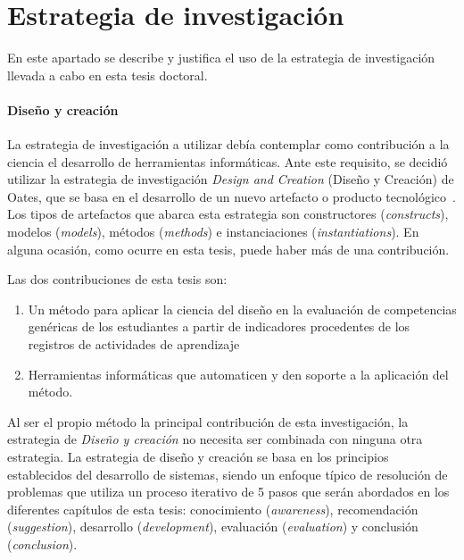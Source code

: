 

\section{Estrategia de investigación}
\label{sec:EstrategiaInvestigacion}

En este apartado se describe y justifica el uso de la estrategia de investigación llevada a cabo en esta tesis doctoral.  

\paragraph*{Diseño y creación} %

La estrategia de investigación a utilizar debía contemplar como contribución a la ciencia el desarrollo de herramientas informáticas. Ante este requisito, se decidió utilizar la estrategia de investigación \emph{Design and Creation} (Diseño y Creación) de Oates, que se basa en el desarrollo de un nuevo artefacto o producto tecnológico~\cite{oates2006researching}. Los tipos de artefactos que abarca esta estrategia son constructores (\emph{constructs}), modelos (\emph{models}), métodos (\emph{methods}) e instanciaciones (\emph{instantiations}). En alguna ocasión, como ocurre en esta tesis, puede haber más de una contribución.

Las dos contribuciones de esta tesis son:
\begin{enumerate}
\item Un método para aplicar la ciencia del diseño en la evaluación de competencias genéricas de los estudiantes a partir de indicadores procedentes de los registros de actividades de aprendizaje
\item Herramientas informáticas que automaticen y den soporte a la aplicación del método.
\end{enumerate} 

Al ser el propio método la principal contribución de esta investigación, la estrategia de \emph{Diseño y creación} no necesita ser combinada con ninguna otra estrategia. La estrategia de diseño y creación se basa en los principios establecidos del desarrollo de sistemas, siendo un enfoque típico de resolución de problemas que utiliza un proceso iterativo de 5 pasos que serán abordados en los diferentes capítulos de esta tesis: conocimiento (\emph{awareness}), recomendación (\emph{suggestion}), desarrollo (\emph{development}), evaluación (\emph{evaluation}) y conclusión (\emph{conclusion}).

